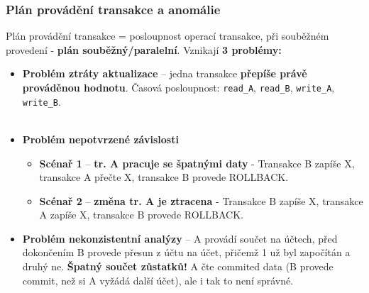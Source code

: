 \subsubsection{Plán provádění transakce a anomálie}
Plán provádění transakce = posloupnost operací transakce, při souběžném provedení - \textbf{plán souběžný/paralelní}. Vznikají \textbf{3 problémy:}
\begin{itemize}
\item \textbf{Problém ztráty aktualizace} -- jedna transakce \textbf{přepíše právě prováděnou hodnotu}. Časová posloupnost: \texttt{read\_A}, \texttt{read\_B}, \texttt{write\_A}, \texttt{write\_B}.
\\\\
\noindent{}
\item \textbf{Problém nepotvrzené závislosti}
	\begin{itemize}
		\item \textbf{Scénař 1} -- \textbf{tr. A pracuje se špatnými daty} - Transakce B zapíše X, transakce A přečte X, transakce B provede ROLLBACK.
		\item \textbf{Scénař 2} -- \textbf{změna tr. A je ztracena} - Transakce B zapíše X, transakce A zapíše X, transakce B provede ROLLBACK.
	\end{itemize}
\noindent{}
\item \textbf{Problém nekonzistentní analýzy} -- A provádí součet na účtech, před dokončením B provede přesun z účtu na účet, přičemž 1 už byl započítán a druhý ne. \textbf{Špatný součet zůstatků!} A čte commited data (B provede commit, než si A vyžádá další účet), ale i tak to není správné.
\\\\
\noindent{}
\end{itemize}

